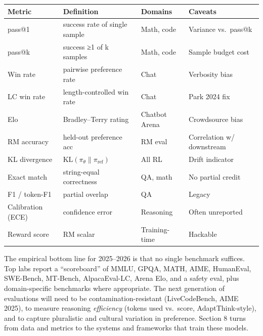 {\def\LTcaptype{none} %
\begin{longtable}[]{@{}
  >{\raggedright\arraybackslash}p{}
  >{\raggedright\arraybackslash}p{}
  >{\raggedright\arraybackslash}p{}
  >{\raggedright\arraybackslash}p{}@{}}
\toprule\noalign{}
\begin{minipage}[b]{\linewidth}\raggedright
Metric
\end{minipage} & \begin{minipage}[b]{\linewidth}\raggedright
Definition
\end{minipage} & \begin{minipage}[b]{\linewidth}\raggedright
Domains
\end{minipage} & \begin{minipage}[b]{\linewidth}\raggedright
Caveats
\end{minipage} \\
\midrule\noalign{}
\endhead
\bottomrule\noalign{}
\endlastfoot
pass@1 & success rate of single sample & Math, code & Variance vs.~pass@k \\
pass@k & success ≥1 of k samples & Math, code & Sample budget cost \\
Win rate & pairwise preference rate & Chat & Verbosity bias \\
LC win rate & length-controlled win rate & Chat & Park 2024 fix \\
Elo & Bradley--Terry rating & Chatbot Arena & Crowdsource bias \\
RM accuracy & held-out preference acc & RM eval & Correlation w/ downstream \\
KL divergence & \(\mathrm{KL}(\pi_\theta\|\pi_{\text{ref}})\) & All RL & Drift indicator \\
Exact match & string-equal correctness & QA, math & No partial credit \\
F1 / token-F1 & partial overlap & QA & Legacy \\
Calibration (ECE) & confidence error & Reasoning & Often unreported \\
Reward score & RM scalar & Training-time & Hackable \\
\end{longtable}
}

The empirical bottom line for 2025--2026 is that no single benchmark suffices. Top labs report a ``scoreboard'' of MMLU, GPQA, MATH, AIME, HumanEval, SWE-Bench, MT-Bench, AlpacaEval-LC, Arena Elo, and a safety eval, plus domain-specific benchmarks where appropriate. The next generation of evaluations will need to be contamination-resistant (LiveCodeBench, AIME 2025), to measure reasoning \emph{efficiency} (tokens used vs.~score, AdaptThink-style), and to capture pluralistic and cultural variation in preference. Section 8 turns from data and metrics to the systems and frameworks that train these models.


